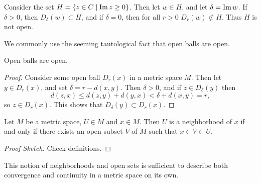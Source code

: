 \documentclass[a4paper]{scrartcl}
\begin{document}
\begin{example}
    Consider the set $H = \{z \in C \mid \operatorname{Im} z \geq 0 \}$.
    Then let $w \in H$, and let $\delta = \operatorname{Im} w$. If $\delta > 0$, then $D_{\delta}(w) \subset H$, and if $\delta = 0$, then for all $r > 0$ $D_r(w) \not \subset H$. Thus $H$ is not open.
\end{example}

We commonly use the seeming tautological fact that open balls are open.

\begin{lemma}
    Open balls are open.
\end{lemma}
\begin{proof}
    Consider some open ball $D_r(x)$ in a metric space $M$. Then let $y \in D_r(x)$, and set $\delta = r - d(x, y)$. Then $\delta >0$, and if $z \in D_{\delta}(y)$ then
    $$
    d(z, x) \leq d(z, y) + d(y, x) < \delta + d(x, y) = r,
    $$
    so $z \in D_r(x)$. This shows that $D_{\delta}(y) \subset D_r(x)$.
\end{proof}

\begin{corollary}
    Let $M$ be a metric space, $U \in M$ and $x \in M$. Then $U$ is a neighborhood of $x$ if and only if there exists an open subset $V$ of $M$ such that $x \in V \subset U$.
\end{corollary}
\begin{proof}[Proof Sketch]
    Check definitions.
\end{proof}

This notion of neighborhoods and open sets is sufficient to describe both convergence and continuity in a metric space on its own.
\end{document}
